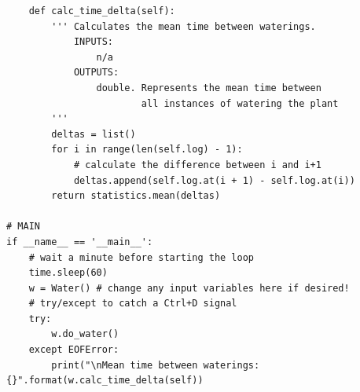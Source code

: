 \documentclass[11pt] {article}
\begin{document}
\begin{lstlisting}
    def calc_time_delta(self):
        ''' Calculates the mean time between waterings.
            INPUTS:
                n/a
            OUTPUTS:
                double. Represents the mean time between
                        all instances of watering the plant
        '''
        deltas = list()
        for i in range(len(self.log) - 1):
            # calculate the difference between i and i+1
            deltas.append(self.log.at(i + 1) - self.log.at(i))
        return statistics.mean(deltas)

# MAIN
if __name__ == '__main__':
    # wait a minute before starting the loop
    time.sleep(60)
    w = Water() # change any input variables here if desired!
    # try/except to catch a Ctrl+D signal
    try:
        w.do_water()
    except EOFError:
        print("\nMean time between waterings: {}".format(w.calc_time_delta(self))
\end{lstlisting}
\end{document}
